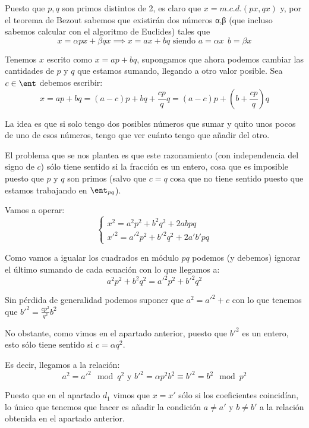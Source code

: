 \begin{problem}[7]
\spart

\spart[$d_1$]

Puesto que $p,q$ son primos distintos de 2, es claro que $x=m.c.d.(px,qx)$ y, por el teorema de Bezout sabemos que existirán dos números α,β (que incluso sabemos calcular con el algoritmo de Euclides) tales que
\[x = αpx + βqx \implies x = ax+bq \text{ siendo } a = αx \ \ b=βx\]

Tenemos $x$ escrito como $x=ap+bq$, supongamos que ahora podemos cambiar las cantidades de $p$ y $q$ que estamos sumando, llegando a otro valor posible. Sea $c \in \ent$ debemos escribir:
\[x=ap+bq = (a-c)p+bq+\frac{cp}{q}q = (a-c)p+\left( b+\frac{cp}{q}\right)q\]

La idea es que si solo tengo dos posibles números que sumar y quito unos pocos de uno de esos números, tengo que ver cuánto tengo que añadir del otro.

El problema que se nos plantea es que este razonamiento (con independencia del signo de $c$) sólo tiene sentido si la fracción es un entero, cosa que es imposible puesto que $p$ y $q$ son primos (salvo que $c=q$ cosa que no tiene sentido puesto que estamos trabajando en $\ent_{pq}$). 

\spart[$d_2$]

Vamos a operar:
\[\left\{ \begin{array}{l}x^2=a^2p^2+b^2q^2+2abpq \\  x'^2=a'^2p^2+b'^2q^2+2a'b'pq\end{array}\right.\]


Como vamos a igualar los cuadrados en módulo $pq$ podemos (y debemos) ignorar el último sumando de cada ecuación con lo que llegamos a:
\[a^2p^2+b^2q^2 = a'^2p^2+b'^2q^2\]

Sin pérdida de generalidad podemos suponer que $a^2=a'^2+c$ con lo que tenemos que $b'^2=\frac{cp^2}{q^2}b^2$

No obstante, como vimos en el apartado anterior, puesto que $b'^2$ es un entero, esto sólo tiene sentido si $c=αq^2$.

Es decir, llegamos a la relación:
\[a^2 = a'^2 \mod q^2 \text{ y } b'^2=αp^2b^2 \equiv b'^2 = b^2 \mod p^2\]

\spart[$d_3$]

Puesto que en el apartado $d_1$ vimos que $x=x'$ sólo si los coeficientes coincidían, lo único que tenemos que hacer es añadir la condición $a\neq a'$ y $b\neq b'$ a la relación obtenida en el apartado anterior.

\spart[$d_4$]


\end{problem}
